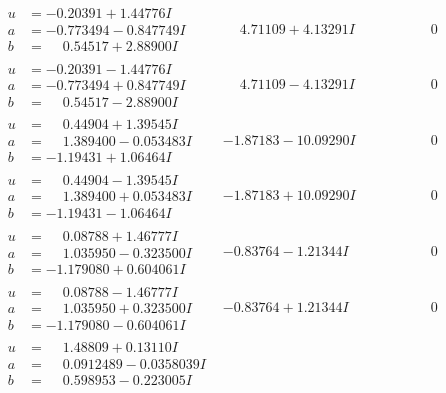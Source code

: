 \documentclass[1p]{elsarticle_modified}
\theoremstyle{definition}
\begin{document}
$$\begin{array}{c|c|c}
\begin{aligned}
u &= -0.20391 + 1.44776 I \\
a &= -0.773494 - 0.847749 I \\
b &= \phantom{-}0.54517 + 2.88900 I\end{aligned}
 & \phantom{-}4.71109 + 4.13291 I & \phantom{-0.000000 } 0 \\ \hline\begin{aligned}
u &= -0.20391 - 1.44776 I \\
a &= -0.773494 + 0.847749 I \\
b &= \phantom{-}0.54517 - 2.88900 I\end{aligned}
 & \phantom{-}4.71109 - 4.13291 I & \phantom{-0.000000 } 0 \\ \hline\begin{aligned}
u &= \phantom{-}0.44904 + 1.39545 I \\
a &= \phantom{-}1.389400 - 0.053483 I \\
b &= -1.19431 + 1.06464 I\end{aligned}
 & -1.87183 - 10.09290 I & \phantom{-0.000000 } 0 \\ \hline\begin{aligned}
u &= \phantom{-}0.44904 - 1.39545 I \\
a &= \phantom{-}1.389400 + 0.053483 I \\
b &= -1.19431 - 1.06464 I\end{aligned}
 & -1.87183 + 10.09290 I & \phantom{-0.000000 } 0 \\ \hline\begin{aligned}
u &= \phantom{-}0.08788 + 1.46777 I \\
a &= \phantom{-}1.035950 - 0.323500 I \\
b &= -1.179080 + 0.604061 I\end{aligned}
 & -0.83764 - 1.21344 I & \phantom{-0.000000 } 0 \\ \hline\begin{aligned}
u &= \phantom{-}0.08788 - 1.46777 I \\
a &= \phantom{-}1.035950 + 0.323500 I \\
b &= -1.179080 - 0.604061 I\end{aligned}
 & -0.83764 + 1.21344 I & \phantom{-0.000000 } 0 \\ \hline\begin{aligned}
u &= \phantom{-}1.48809 + 0.13110 I \\
a &= \phantom{-}0.0912489 - 0.0358039 I \\
b &= \phantom{-}0.598953 - 0.223005 I\end{aligned}

\end{array}$$
\end{document}
